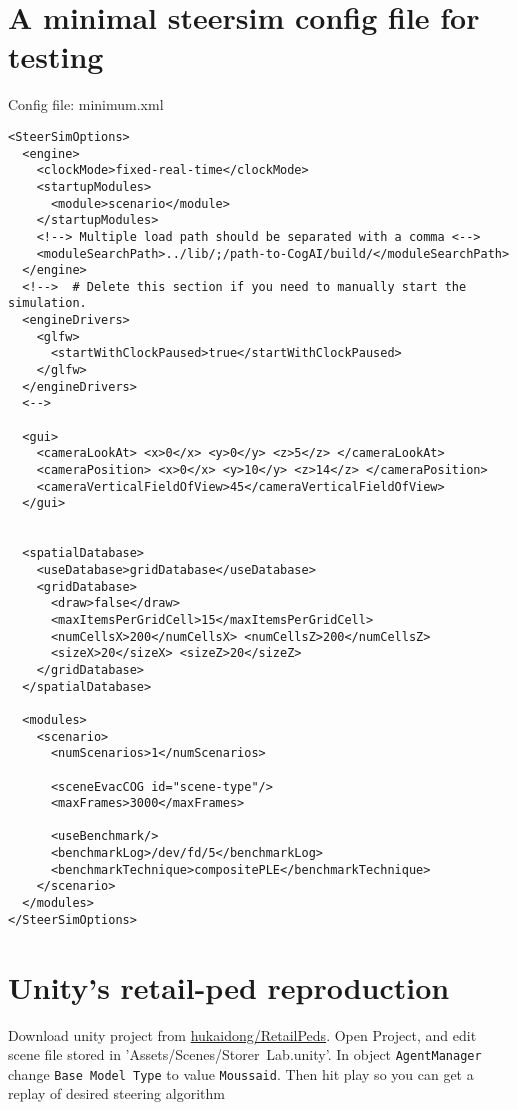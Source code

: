 \section{A minimal steersim config file for testing}
Config file:  minimum.xml
\begin{verbatim}
<SteerSimOptions>
  <engine>
    <clockMode>fixed-real-time</clockMode>
    <startupModules>
      <module>scenario</module>
    </startupModules>
    <!--> Multiple load path should be separated with a comma <-->
    <moduleSearchPath>../lib/;/path-to-CogAI/build/</moduleSearchPath>
  </engine>
  <!-->  # Delete this section if you need to manually start the simulation.
  <engineDrivers>
    <glfw>
      <startWithClockPaused>true</startWithClockPaused>
    </glfw>
  </engineDrivers>
  <-->

  <gui>
    <cameraLookAt> <x>0</x> <y>0</y> <z>5</z> </cameraLookAt>
    <cameraPosition> <x>0</x> <y>10</y> <z>14</z> </cameraPosition>
    <cameraVerticalFieldOfView>45</cameraVerticalFieldOfView>
  </gui>


  <spatialDatabase>
    <useDatabase>gridDatabase</useDatabase>
    <gridDatabase>
      <draw>false</draw>
      <maxItemsPerGridCell>15</maxItemsPerGridCell>
      <numCellsX>200</numCellsX> <numCellsZ>200</numCellsZ>
      <sizeX>20</sizeX> <sizeZ>20</sizeZ>
    </gridDatabase>
  </spatialDatabase>

  <modules>
    <scenario>
      <numScenarios>1</numScenarios>

      <sceneEvacCOG id="scene-type"/>
      <maxFrames>3000</maxFrames>

      <useBenchmark/>
      <benchmarkLog>/dev/fd/5</benchmarkLog>
      <benchmarkTechnique>compositePLE</benchmarkTechnique>
    </scenario>
  </modules>
</SteerSimOptions>
\end{verbatim}


\section{Unity's retail-ped reproduction} %

Download unity project from \href{ 
https://github.com/hukaidong/RetailPeds/tree/a46f14017152f101e3e420522edc3b41b4406dbc 
}{hukaidong/RetailPeds}. Open Project, and edit scene file stored in 
'Assets/Scenes/Storer~Lab.unity'. In object \texttt{AgentManager} 
change \texttt{Base Model Type} to value 
\texttt{Moussaid}. Then hit play so you can get a replay of desired 
steering algorithm \cite{moussaid2011how}


